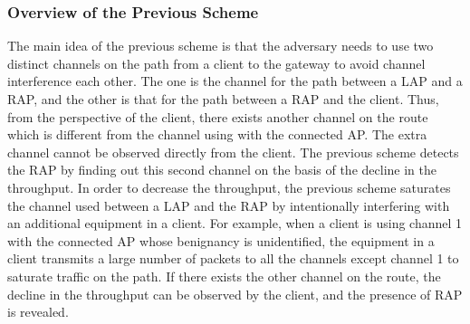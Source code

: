 \documentclass[conference]{IEEEtran}
\begin{document}
\subsubsection{Overview of the Previous Scheme}
The main idea of the previous scheme \cite{previous} is that the adversary needs to use two distinct channels on the path from a client to the gateway to avoid channel interference each other.
The one is the channel for the path between a LAP and a RAP, and the other is that for the path between a RAP and the client.
Thus, from the perspective of the client, there exists another channel on the route which is different from the channel using with the connected AP.
The extra channel cannot be observed directly from the client.
The previous scheme detects the RAP by finding out this second channel on the basis of the decline in the throughput.
In order to decrease the throughput, the previous scheme saturates the channel used between a LAP and the RAP by intentionally interfering with an additional equipment in a client.
For example, when a client is using channel 1 with the connected AP whose benignancy is unidentified, the equipment in a client transmits a large number of packets to all the channels except channel 1 to saturate traffic on the path.
If there exists the other channel on the route, the decline in the throughput can be observed by the client, and the presence of RAP is revealed.
\end{document}
